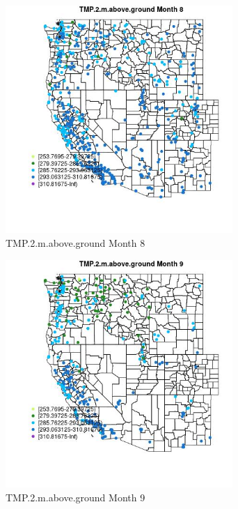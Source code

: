 \begin{figure} 
\centering  
\includegraphics[width=0.77\textwidth]{Code_Outputs/Report_ML_input_PM25_Step4_part_e_de_duplicated_aves_compiled_2019-05-18wNAs_MapObsMo8TMP2maboveground.jpg} 
\caption{\label{fig:Report_ML_input_PM25_Step4_part_e_de_duplicated_aves_compiled_2019-05-18wNAsMapObsMo8TMP2maboveground}TMP.2.m.above.ground Month 8} 
\end{figure} 
 

\begin{figure} 
\centering  
\includegraphics[width=0.77\textwidth]{Code_Outputs/Report_ML_input_PM25_Step4_part_e_de_duplicated_aves_compiled_2019-05-18wNAs_MapObsMo9TMP2maboveground.jpg} 
\caption{\label{fig:Report_ML_input_PM25_Step4_part_e_de_duplicated_aves_compiled_2019-05-18wNAsMapObsMo9TMP2maboveground}TMP.2.m.above.ground Month 9} 
\end{figure} 
 

